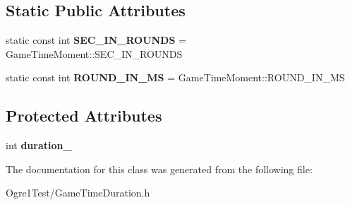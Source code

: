 \subsection*{Static Public Attributes}
\begin{DoxyCompactItemize}
\item 
static const int {\bfseries S\+E\+C\+\_\+\+I\+N\+\_\+\+R\+O\+U\+N\+DS} = Game\+Time\+Moment\+::\+S\+E\+C\+\_\+\+I\+N\+\_\+\+R\+O\+U\+N\+DS\hypertarget{class_game_time_duration_a1518e06195ce5ab1be10ca1e7edb1610}{}\label{class_game_time_duration_a1518e06195ce5ab1be10ca1e7edb1610}

\item 
static const int {\bfseries R\+O\+U\+N\+D\+\_\+\+I\+N\+\_\+\+MS} = Game\+Time\+Moment\+::\+R\+O\+U\+N\+D\+\_\+\+I\+N\+\_\+\+MS\hypertarget{class_game_time_duration_a1c76927599ab96e03ddcf23773118b60}{}\label{class_game_time_duration_a1c76927599ab96e03ddcf23773118b60}

\end{DoxyCompactItemize}
\subsection*{Protected Attributes}
\begin{DoxyCompactItemize}
\item 
int {\bfseries duration\+\_\+}\hypertarget{class_game_time_duration_aa83c767142bdf4f4714264f8fa39bba6}{}\label{class_game_time_duration_aa83c767142bdf4f4714264f8fa39bba6}

\end{DoxyCompactItemize}


The documentation for this class was generated from the following file\+:\begin{DoxyCompactItemize}
\item 
Ogre1\+Test/Game\+Time\+Duration.\+h\end{DoxyCompactItemize}
